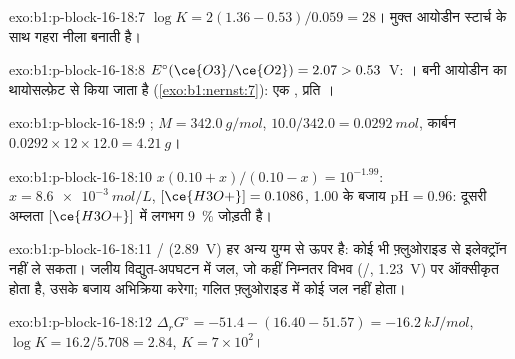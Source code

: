 \begin{solution}{exo:b1:p-block-16-18:7}
$\log K = 2(1.36 - 0.53)/0.059 = 28$। मुक्त आयोडीन स्टार्च के साथ गहरा
नीला  बनाती है।
\end{solution}

\begin{solution}{exo:b1:p-block-16-18:8}
$E^\circ(\ce{O3}/\ce{O2}) = 2.07 > 0.53$~V: । बनी आयोडीन का थायोसल्फ़ेट से  किया जाता है
(\cref{exo:b1:nernst:7}): एक , प्रति ।
\end{solution}

\begin{solution}{exo:b1:p-block-16-18:9}
; $M = \qty{342.0}{g/mol}$, $10.0/342.0 =
\qty{0.0292}{mol}$, कार्बन $0.0292 \times 12 \times 12.0 = \qty{4.21}{g}$।
\end{solution}

\begin{solution}{exo:b1:p-block-16-18:10}
$x(0.10 + x)/(0.10 - x) = 10^{-1.99}$: $x = \qty{8.6e-3}{mol/L}$,
$[\ce{H3O+}] = 0.1086$, 1.00 के बजाय $\mathrm{pH} = 0.96$: दूसरी
अम्लता $[\ce{H3O+}]$ में लगभग \qty{9}{\percent} जोड़ती है।
\end{solution}

\begin{solution}{exo:b1:p-block-16-18:11}
/ (2.89~V) हर अन्य युग्म से ऊपर है: कोई भी 
फ़्लुओराइड से इलेक्ट्रॉन नहीं ले सकता। जलीय विद्युत-अपघटन में जल, जो
कहीं निम्नतर विभव (/, 1.23~V) पर ऑक्सीकृत होता है, उसके बजाय अभिक्रिया करेगा;
गलित फ़्लुओराइड में कोई जल नहीं होता।
\end{solution}

\begin{solution}{exo:b1:p-block-16-18:12}
$\Delta_r G^\circ = -51.4 - (16.40 - 51.57) = \qty{-16.2}{kJ/mol}$,
$\log K = 16.2/5.708 = 2.84$, $K = 7 \times 10^2$।
\end{solution}

